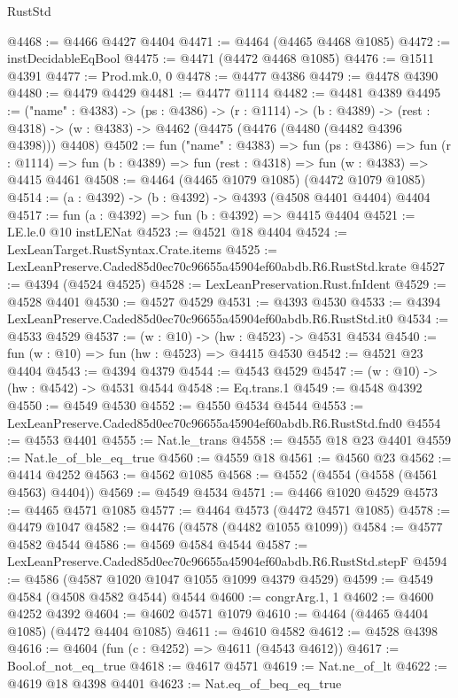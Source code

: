 \begin{lexlean}{RustStd}
\begin{coremodule}
@4468 := @4466 @4427 @4404
@4471 := @4464 (@4465 @4468 @1085)
@4472 := instDecidableEqBool
@4475 := @4471 (@4472 @4468 @1085)
@4476 := @1511 @4391
@4477 := Prod.mk.{0, 0}
@4478 := @4477 @4386
@4479 := @4478 @4390
@4480 := @4479 @4429
@4481 := @4477 @1114
@4482 := @4481 @4389
@4495 := ("name" : @4383) ->
  (ps : @4386) ->
  (r : @1114) ->
  (b : @4389) ->
  (rest : @4318) -> (w : @4383) -> @4462 (@4475 (@4476 (@4480 (@4482 @4396 @4398))) @4408)
@4502 := fun ("name" : @4383) =>
  fun (ps : @4386) =>
  fun (r : @1114) => fun (b : @4389) => fun (rest : @4318) => fun (w : @4383) => @4415 @4461
@4508 := @4464 (@4465 @1079 @1085) (@4472 @1079 @1085)
@4514 := (a : @4392) -> (b : @4392) -> @4393 (@4508 @4401 @4404) @4404
@4517 := fun (a : @4392) => fun (b : @4392) => @4415 @4404
@4521 := LE.le.{0} @10 instLENat
@4523 := @4521 @18 @4404
@4524 := LexLeanTarget.RustSyntax.Crate.items
@4525 := LexLeanPreserve.Caded85d0ec70c96655a45904ef60abdb.R6.RustStd.krate
@4527 := @4394 (@4524 @4525)
@4528 := LexLeanPreservation.Rust.fnIdent
@4529 := @4528 @4401
@4530 := @4527 @4529
@4531 := @4393 @4530
@4533 := @4394 LexLeanPreserve.Caded85d0ec70c96655a45904ef60abdb.R6.RustStd.it0
@4534 := @4533 @4529
@4537 := (w : @10) -> (hw : @4523) -> @4531 @4534
@4540 := fun (w : @10) => fun (hw : @4523) => @4415 @4530
@4542 := @4521 @23 @4404
@4543 := @4394 @4379
@4544 := @4543 @4529
@4547 := (w : @10) -> (hw : @4542) -> @4531 @4544
@4548 := Eq.trans.{1}
@4549 := @4548 @4392
@4550 := @4549 @4530
@4552 := @4550 @4534 @4544
@4553 := LexLeanPreserve.Caded85d0ec70c96655a45904ef60abdb.R6.RustStd.fnd0
@4554 := @4553 @4401
@4555 := Nat.le_trans
@4558 := @4555 @18 @23 @4401
@4559 := Nat.le_of_ble_eq_true
@4560 := @4559 @18
@4561 := @4560 @23
@4562 := @4414 @4252
@4563 := @4562 @1085
@4568 := @4552 (@4554 (@4558 (@4561 @4563) @4404))
@4569 := @4549 @4534
@4571 := @4466 @1020 @4529
@4573 := @4465 @4571 @1085
@4577 := @4464 @4573 (@4472 @4571 @1085)
@4578 := @4479 @1047
@4582 := @4476 (@4578 (@4482 @1055 @1099))
@4584 := @4577 @4582 @4544
@4586 := @4569 @4584 @4544
@4587 := LexLeanPreserve.Caded85d0ec70c96655a45904ef60abdb.R6.RustStd.stepF
@4594 := @4586 (@4587 @1020 @1047 @1055 @1099 @4379 @4529)
@4599 := @4549 @4584 (@4508 @4582 @4544) @4544
@4600 := congrArg.{1, 1}
@4602 := @4600 @4252 @4392
@4604 := @4602 @4571 @1079
@4610 := @4464 (@4465 @4404 @1085) (@4472 @4404 @1085)
@4611 := @4610 @4582
@4612 := @4528 @4398
@4616 := @4604 (fun (c : @4252) => @4611 (@4543 @4612))
@4617 := Bool.of_not_eq_true
@4618 := @4617 @4571
@4619 := Nat.ne_of_lt
@4622 := @4619 @18 @4398 @4401
@4623 := Nat.eq_of_beq_eq_true

\end{coremodule}
\end{lexlean}
